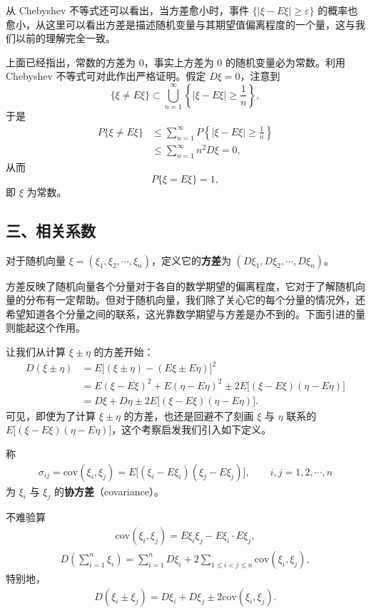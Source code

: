 \documentclass[../../main.tex]{subfiles}
\begin{document}
从 Chebyshev 不等式还可以看出，当方差愈小时，事件 $\{|\xi-E\xi|\geqslant\varepsilon\}$ 的概率也愈小，从这里可以看出方差是描述随机变量与其期望值偏离程度的一个量，这与我们以前的理解完全一致。

上面已经指出，常数的方差为 $0$，事实上方差为 $0$ 的随机变量必为常数。利用 Chebyshev 不等式可对此作出严格证明。假定 $D\xi=0$，注意到
\[
\{\xi\neq E\xi\}\subset\bigcup_{n=1}^{\infty}\left\{|\xi-E\xi|\geqslant\frac{1}{n}\right\},
\]
于是
\begin{align*}
P\{\xi\neq E\xi\}&\leqslant\sum_{n=1}^{\infty}P\left\{|\xi-E\xi|\geqslant\frac{1}{n}\right\}\\
&\leqslant\sum_{n=1}^{\infty}n^2 D\xi=0,
\end{align*}
从而
\[
P\{\xi=E\xi\}=1,
\]
即 $\xi$ 为常数。

\subsection*{三、相关系数}

对于随机向量 $\xi=(\xi_1,\xi_2,\cdots,\xi_n)$，定义它的\textbf{方差}为 $(D\xi_1,D\xi_2,\cdots,D\xi_n)$。

方差反映了随机向量各个分量对于各自的数学期望的偏离程度，它对于了解随机向量的分布有一定帮助。但对于随机向量，我们除了关心它的每个分量的情况外，还希望知道各个分量之间的联系，这光靠数学期望与方差是办不到的。下面引进的量则能起这个作用。

让我们从计算 $\xi\pm\eta$ 的方差开始：
\begin{align*}
D(\xi\pm\eta)&=E\bigl[(\xi\pm\eta)-(E\xi\pm E\eta)\bigr]^2\\
&=E(\xi-E\xi)^2+E(\eta-E\eta)^2\pm 2E\bigl[(\xi-E\xi)(\eta-E\eta)\bigr]\\
&=D\xi+D\eta\pm 2E\bigl[(\xi-E\xi)(\eta-E\eta)\bigr].
\end{align*}
可见，即使为了计算 $\xi\pm\eta$ 的方差，也还是回避不了刻画 $\xi$ 与 $\eta$ 联系的 $E\bigl[(\xi-E\xi)(\eta-E\eta)\bigr]$，这个考察启发我们引入如下定义。

\begin{definition}[协方差]\label{definition:ch04-协方差}
称
\begin{align}
\sigma_{ij}=\mathrm{cov}(\xi_i,\xi_j)=E\bigl[(\xi_i-E\xi_i)(\xi_j-E\xi_j)\bigr],\qquad i,j=1,2,\cdots,n\label{align:ch04-协方差定义}
\end{align}
为 $\xi_i$ 与 $\xi_j$ 的\textbf{协方差}（covariance）。
\end{definition}

不难验算
\begin{align}
\mathrm{cov}(\xi_i,\xi_j)=E\xi_i\xi_j-E\xi_i\cdot E\xi_j,\label{align:ch04-协方差展开}
\end{align}
\begin{align}
D\left(\sum_{i=1}^n\xi_i\right)=\sum_{i=1}^n D\xi_i+2\sum_{1\leqslant i<j\leqslant n}\mathrm{cov}(\xi_i,\xi_j),\label{align:ch04-方差和}
\end{align}
特别地，
\begin{align}
D(\xi_i\pm\xi_j)=D\xi_i+D\xi_j\pm 2\mathrm{cov}(\xi_i,\xi_j).\label{align:ch04-方差和两项}
\end{align}
\end{document}
